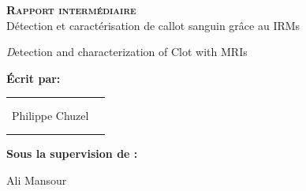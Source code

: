 
\begingroup
\thispagestyle{empty}
\begin{center}
\vspace*{2cm}
{\Huge \textsc{\textbf{Rapport intermédiaire}}}\\


\vspace*{2cm}
{\huge Détection et caractérisation de callot sanguin grâce au IRMs}\par %
{\textit Detection and characterization of Clot with MRIs}\par %
\end{center}

\vspace*{1.5cm}
\textbf{\large Écrit par:} 
\begin{center}
{\large
\begin{tabular}{cc}
\\
\\
\\
Philippe Chuzel\\
\\
\\
\end{tabular}}
\end{center}


\vspace*{1.5 cm}
{\large \textbf{Sous la supervision de :}}\\
\begin{center}
{\large
Ali Mansour}
\end{center}
\endgroup
